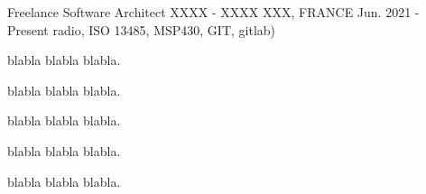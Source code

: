 

\begin{cventries}

  \cventry
    {Freelance Software Architect} %
    {XXXX - XXXX} %
    {XXX, FRANCE} %
    {Jun. 2021 - Present} %
    {radio, ISO 13485, MSP430, GIT, gitlab)} %
    {
      \begin{cvitems} %
        \item {blabla blabla blabla.}
        \item {blabla blabla blabla.}
        \item {blabla blabla blabla.}
        \item {blabla blabla blabla.}
        \item {blabla blabla blabla.}
      \end{cvitems}
    }

\end{cventries}
